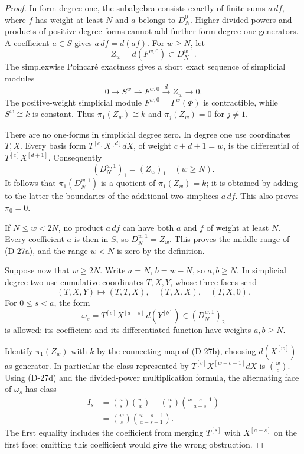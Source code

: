\begin{proof}
In form degree one, the subalgebra consists exactly of finite
sums \(a\,df\), where \(f\) has weight at least \(N\) and \(a\)
belongs to \(D_N^0\). Higher divided powers and products of
positive-degree forms cannot add further form-degree-one
generators. A coefficient \(a\in S\) gives \(a\,df=d(af)\).
For \(w\ge N\), let
\[
 Z_w=d(F^{w,0})\subset D_N^{w,1}.
\]
The simplexwise Poincar\'e exactness gives a short exact
sequence of simplicial modules
\[
 0\longrightarrow S^w\longrightarrow F^{w,0}
             \xrightarrow{d} Z_w\longrightarrow0.
 \tag{D-27b}
\]
The positive-weight simplicial module \(F^{w,0}=\Gamma^w(\Phi)\)
is contractible, while \(S^w\cong k\) is constant. Thus
\(\pi_1(Z_w)\cong k\) and \(\pi_j(Z_w)=0\) for \(j\ne1\).

There are no one-forms in simplicial degree zero. In degree
one use coordinates \(T,X\). Every basis form
\(T^{[c]}X^{[d]}dX\), of weight \(c+d+1=w\), is the
differential of \(T^{[c]}X^{[d+1]}\).
Consequently
\[
              (D_N^{w,1})_1=(Z_w)_1
                  \quad(w\ge N).
 \tag{D-27c}
\]
It follows that \(\pi_1(D_N^{w,1})\) is a quotient of
\(\pi_1(Z_w)=k\); it is obtained by adding to the latter
the boundaries of the additional two-simplices \(a\,df\).
This also proves \(\pi_0=0\).

If \(N\le w<2N\), no product \(a\,df\) can have both
\(a\) and \(f\) of weight at least \(N\). Every coefficient
\(a\) is then in \(S\), so \(D_N^{w,1}=Z_w\). This proves
the middle range of (D-27a), and the range \(w<N\) is zero
by the definition.

Suppose now that \(w\ge2N\). Write \(a=N\), \(b=w-N\),
so \(a,b\ge N\). In simplicial degree two use cumulative
coordinates \(T,X,Y\), whose three faces send
\[
 (T,X,Y)\longmapsto(T,T,X),\quad(T,X,X),\quad(T,X,0).
 \tag{D-27d}
\]
For \(0\le s<a\), the form
\[
 \omega_s=T^{[s]}X^{[a-s]}\,d(Y^{[b]})
                 \in(D_N^{w,1})_2
\]
is allowed: its coefficient and its differentiated
function have weights \(a,b\ge N\).

Identify \(\pi_1(Z_w)\) with \(k\) by the connecting
map of (D-27b), choosing \(d(X^{[w]})\) as generator.
In particular the class represented by
\(T^{[c]}X^{[w-c-1]}dX\) is
\(\binom wc\). Using (D-27d) and the divided-power
multiplication formula, the alternating face of
\(\omega_s\) has class
\[
 \begin{aligned}
 I_s
 &=\binom as\binom wa
   -\binom ws\binom{w-s-1}{a-s}\\
 &=\binom ws\binom{w-s-1}{a-s-1}.
 \end{aligned}
 \tag{D-27e}
\]
The first equality includes the coefficient from merging
\(T^{[s]}\) with \(X^{[a-s]}\) on the first face;
omitting this coefficient would give the wrong obstruction.


\end{proof}
